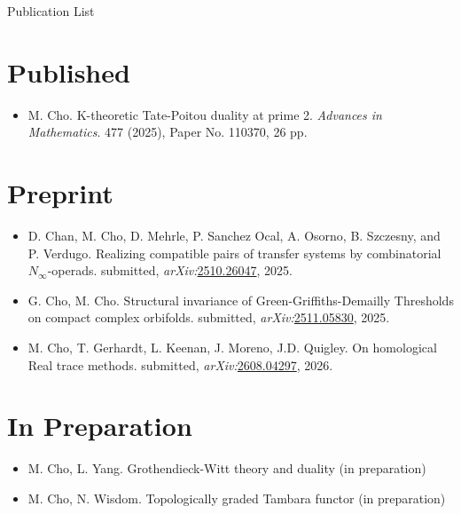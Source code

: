 \documentclass[11pt]{article}
\begin{document}

\begin{center}
\LARGE{Publication List}
\end{center}

\section*{Published}
\begin{itemize}
    \item M. Cho. {K-theoretic Tate-Poitou duality at prime 2}. {\it Advances in Mathematics}. 477 (2025), Paper No. 110370, 26 pp. 
\end{itemize}

\section*{Preprint}
\begin{itemize}
     \item D. Chan, M. Cho, D. Mehrle, P. Sanchez Ocal, A. Osorno, B. Szczesny, and P. Verdugo.
Realizing compatible pairs of transfer systems by combinatorial $N_\infty$-operads.
submitted, \textit{arXiv:}\href{https://arxiv.org/abs/2510.26047}{2510.26047}, 2025.
    \item G. Cho, M. Cho.  Structural invariance of Green-Griffiths-Demailly Thresholds on compact complex orbifolds. submitted, \textit{arXiv:}\href{https://arxiv.org/abs/2511.05830}{2511.05830}, 2025.
    \item M. Cho, T. Gerhardt, L. Keenan, J. Moreno, J.D. Quigley. On homological Real trace methods. submitted, \textit{arXiv:}\href{https://arxiv.org/abs/2608.04297}{2608.04297}, 2026.
\end{itemize}     

\section*{In Preparation}
\begin{itemize}
    \item M. Cho, L. Yang. Grothendieck-Witt theory and duality (in preparation)
    \item M. Cho, N. Wisdom. Topologically graded Tambara functor (in preparation)


\end{itemize}
\end{document}
